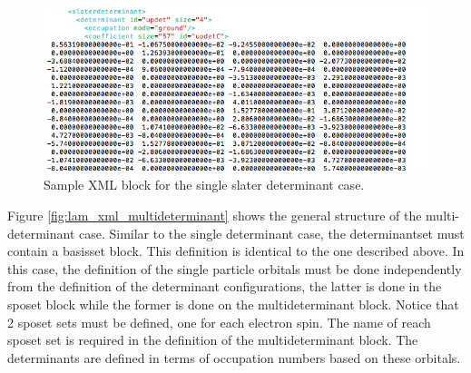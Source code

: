 \begin{figure}[ht!]
\begin{center}
\includegraphics[trim = 0mm 0mm 0mm 0mm, clip,width=1.0\columnwidth]{./figures/lab_advanced_molecules_xml_slaterdeterminant}
\end{center}
\caption{Sample XML block for the single slater determinant case.
\label{fig:lam_xml_slaterdeterminant}
}
\end{figure}

Figure \ref{fig:lam_xml_multideterminant} shows the general structure of the multi-determinant case. 
Similar to the
single determinant case, the determinantset must contain a basisset block. This definition is
identical to the one described above. In this case, the definition of the single particle orbitals
must be done independently from the definition of the determinant configurations, the latter
is done in the sposet block while the former is done on the multideterminant block. Notice
that 2 sposet sets must be defined, one for each electron spin. The name of reach sposet set
is required in the definition of the multideterminant block. The determinants are defined in
terms of occupation numbers based on these orbitals.

